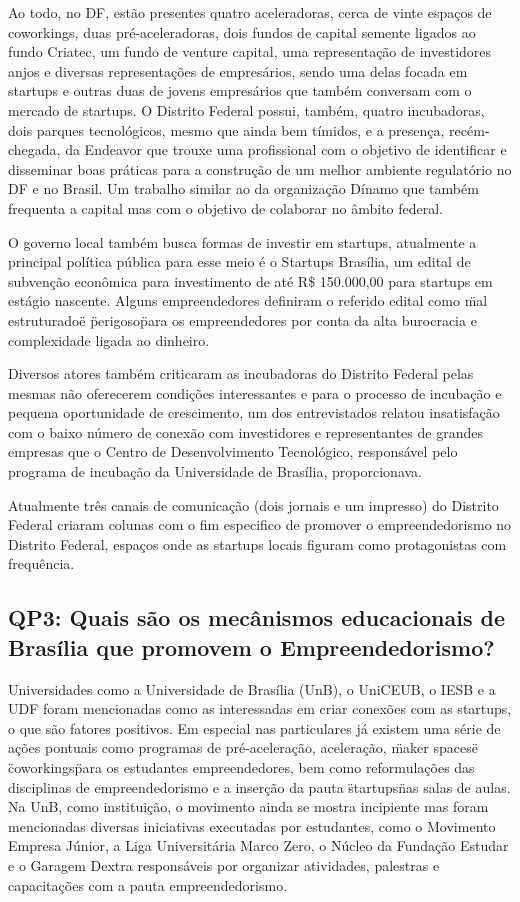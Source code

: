 Ao todo, no DF, estão presentes quatro aceleradoras, cerca de vinte espaços de coworkings, duas pré-aceleradoras, dois fundos de capital semente ligados ao fundo Criatec, um fundo de venture capital, uma representação de investidores anjos e diversas representações de empresários, sendo uma delas focada em startups e outras duas de jovens empresários que também conversam com o mercado de startups. O Distrito Federal possui, também, quatro incubadoras, dois parques tecnológicos, mesmo que ainda bem tímidos, e a presença, recém-chegada, da Endeavor que trouxe uma profissional com o objetivo de identificar e disseminar boas práticas para a construção de um melhor ambiente regulatório no DF e no Brasil. Um trabalho similar ao da organização Dínamo que também frequenta a capital mas com o objetivo de colaborar no âmbito federal.

O governo local também busca formas de investir em startups, atualmente a principal política pública para esse meio é o Startups Brasília, um edital de subvenção econômica para investimento de até R\$ 150.000,00 para startups em estágio nascente. Alguns empreendedores definiram o referido edital como \"mal estruturado\" e \"perigoso\" para os empreendedores por conta da alta burocracia e complexidade ligada ao dinheiro. 

Diversos atores também criticaram as incubadoras do Distrito Federal pelas mesmas não oferecerem condições interessantes e para o processo de incubação e pequena oportunidade de crescimento, um dos entrevistados relatou insatisfação com o baixo número de conexão com investidores e representantes de grandes empresas que o Centro de Desenvolvimento Tecnológico, responsável pelo programa de incubação da Universidade de Brasília, proporcionava.

Atualmente três canais de comunicação (dois jornais e um impresso) do Distrito Federal criaram colunas com o fim especifico de promover o empreendedorismo no Distrito Federal, espaços onde as startups locais figuram como protagonistas com frequência.

\subsection{QP3: Quais são os mecânismos educacionais de Brasília que promovem o Empreendedorismo?}
\label{subsection:pergunta_de_pesquisa_3}

Universidades como a Universidade de Brasília (UnB), o UniCEUB, o IESB e a UDF foram mencionadas como as  interessadas em criar conexões com as startups, o que são fatores positivos. Em especial nas particulares já existem uma série de ações pontuais como programas de pré-aceleração, aceleração, \"maker spaces\" e \"coworkings\" para os estudantes empreendedores, bem como reformulações das disciplinas de empreendedorismo e a inserção da pauta \"startups\" nas salas de aulas. Na UnB, como instituição, o movimento ainda se mostra incipiente mas foram mencionadas diversas iniciativas executadas por estudantes, como o Movimento Empresa Júnior, a Liga Universitária Marco Zero, o Núcleo da Fundação Estudar e o Garagem Dextra responsáveis por organizar atividades, palestras e capacitações com a pauta empreendedorismo. 

